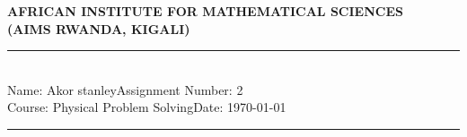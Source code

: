 \documentclass[12pt,a4paper]{article}
\newcommand{\student}{Akor stanley}
\newcommand{\course}{Physical Problem Solving}
\newcommand{\assignment}{2}
\begin{document}
\thispagestyle{empty}
\begin{center}
\textbf{AFRICAN INSTITUTE FOR MATHEMATICAL SCIENCES \\[0.5cm]
(AIMS RWANDA, KIGALI)}
\vspace{1.0cm}
\end{center}

\noindent
\rule{17cm}{0.2cm}\\[0.3cm]
Name: \student \hfill Assignment Number: \assignment\\[0.1cm]
Course: \course \hfill Date: \today\\
\rule{17cm}{0.05cm}
\vspace{1.0cm}
\end{document}
